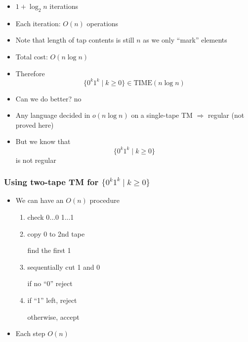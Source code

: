 \begin{frame}[allowframebreaks]
\begin{itemize}
\item [] $1+\log_2 n$ iterations

\item Each iteration: $O(n)$ operations
\item [] Note that length of tap contents is still $n$ as we only ``mark'' elements
\item Total cost: $O(n \log n)$

\item Therefore
  \begin{equation*}
\{0^k 1^k\mid k \geq 0\} \in \text{TIME}(n \log n)
\end{equation*}
\item Can we do better? no

\item Any language decided in $o(n\log n)$
on a single-tape TM $\Rightarrow$ regular
(not proved here)
\item But we know that
  \begin{equation*}
  \{0^k1^k \mid k \geq 0\}
\end{equation*}
is not regular

\end{itemize}\end{frame} \begin{frame}[allowframebreaks] \frametitle{Using two-tape TM for $ \{0^k1^k \mid k \geq 0\}$}
  \begin{itemize}
\item We can have an $O(n)$ procedure
  \begin{enumerate}
  \item check 0...0 1...1

  \item copy 0 to 2nd tape

find the first 1
\item sequentially cut 1 and 0

if no ``0'' reject
\item if ``1'' left, reject

otherwise, accept
  \end{enumerate}

\item Each step $O(n)$

\end{itemize}\end{frame} 


